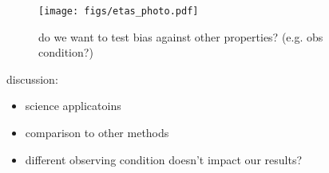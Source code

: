 \begin{figure}
\begin{center}
    \texttt{[image: figs/etas\_photo.pdf]}
    \caption{do we want to test bias against other properties? (e.g. obs condition?)} 
    \label{fig:systematics}
\end{center}
\end{figure}




discussion: 
\begin{itemize}
    \item science applicatoins 
    \item comparison to other methods 
    \item different observing condition doesn't impact our results? 
\end{itemize}

